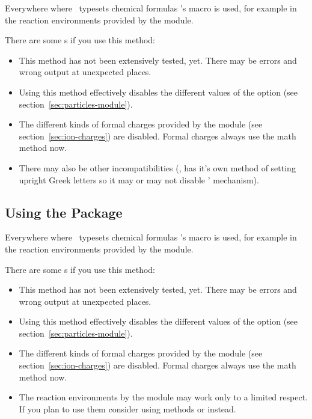 \documentclass{chemmacros-manual}
\begin{document}
Everywhere where \chemmacros\ typesets chemical formulas 's macro
 is used, for example in the reaction environments provided by the
 module.

There are some s if you use this method:
\begin{itemize}
  \item This method has not been extensively tested, yet.  There may be errors
     and wrong output at unexpected places.
  \item Using this method effectively disables the different values of the
     option  (see
    section~\ref{sec:particles-module}).
  \item The different kinds of formal charges provided by the
     module (see section~\ref{sec:ion-charges}) are
    disabled.  Formal charges always use the math method now.
  \item There may also be other incompatibilities (\eg,  has it's
    own method of setting upright Greek letters so it may or may not disable
    \chemmacros' mechanism).
\end{itemize}

\subsection{Using the  Package}\label{sec:using-chemfig}
Everywhere where \chemmacros\ typesets chemical formulas 's macro
 is used, for example in the reaction environments provided by
the  module.

There are some s if you use this method:
\begin{itemize}
  \item This method has not been extensively tested, yet.  There may be errors
     and wrong output at unexpected places.
  \item Using this method effectively disables the different values of the
     option  (see
    section~\ref{sec:particles-module}).
  \item The different kinds of formal charges provided by the
     module (see section~\ref{sec:ion-charges}) are
    disabled.  Formal charges always use the math method now.
  \item The reaction environments by the  module may
    work only to a limited respect.  If you plan to use them consider using
    methods  or  instead.
\end{itemize}
\end{document}

